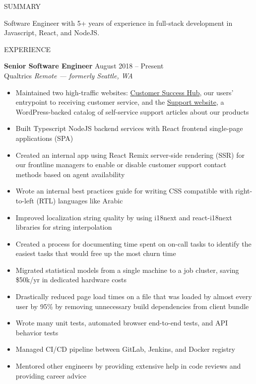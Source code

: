 \documentclass{resume} %
\begin{document}
\begin{rSection}{SUMMARY}

	{Software Engineer with 5+ years of experience in full-stack development in Javascript, React, and NodeJS.}

\end{rSection}


\begin{rSection}{EXPERIENCE}

	\textbf{Senior Software Engineer} \hfill August 2018 -- Present\\
	Qualtrics \hfill \textit{Remote --- formerly Seattle, WA}
	\begin{itemize}
		\itemsep -3pt {}
		\item Maintained two high-traffic websites: \href{https://support-portal.qualtrics.com/}{Customer Success Hub}, our users' entrypoint to receiving customer service, and the \href{https://www.qualtrics.com/support/}{Support website}, a WordPress-backed catalog of self-service support articles about our products
		\item Built Typescript NodeJS backend services with React frontend single-page applications (SPA)
		\item Created an internal app using React Remix server-side rendering (SSR) for our frontline managers to enable or disable customer support contact methods based on agent availability
		\item Wrote an internal best practices guide for writing CSS compatible with right-to-left (RTL) languages like Arabic
		\item Improved localization string quality by using i18next and react-i18next libraries for string interpolation
		\item Created a process for documenting time spent on on-call tasks to identify the easiest tasks that would free up the most churn time
		\item Migrated statistical models from a single machine to a job cluster, saving \$50k/yr in dedicated hardware costs
        \item Drastically reduced page load times on a file that was loaded by almost every user by 95\% by removing unnecessary build dependencies from client bundle
		\item Wrote many unit tests, automated browser end-to-end tests, and API behavior tests
		\item Managed CI/CD pipeline between GitLab, Jenkins, and Docker registry
		\item Mentored other engineers by providing extensive help in code reviews and providing career advice
	\end{itemize}
\end{rSection}
\end{document}
